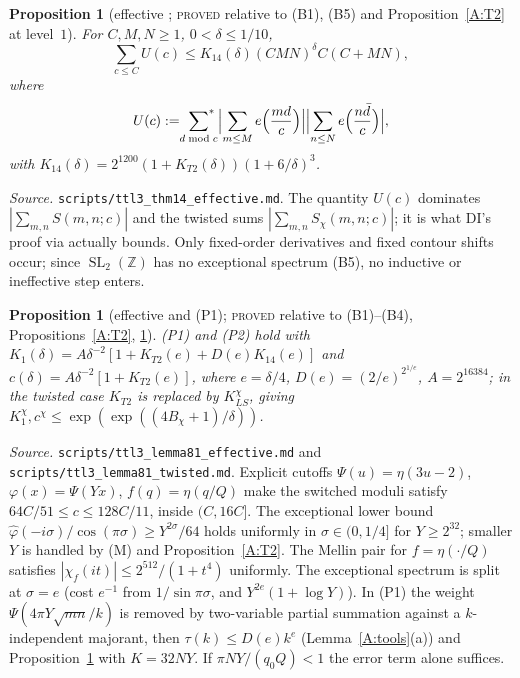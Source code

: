 \documentclass[10pt,reqno]{amsart}
\newtheorem{proposition}[theorem]{Proposition}
\theoremstyle{definition}
\numberwithin{equation}{section}
\newcommand{\Z}{\mathbb Z}
\DeclareMathOperator{\SL}{SL}
\newcommand{\status}[1]{\textup{\textsc{#1}}}
\begin{document}
\begin{proposition}[effective {\cite[Theorem~14]{DI}}; \status{proved} relative to (B1), (B5) and Proposition~\ref{A:T2} at level~$1$]\label{A:T14}
For $C,M,N\ge1$, $0<\delta\le1/10$,
\[
 \sum_{c\le C}U(c)\le K_{14}(\delta)(CMN)^\delta C(C+MN),
\]
where
\[
 U(c):=\sideset{}{^*}\sum_{d\bmod c}\Bigl|\sum_{m\le M}e\Bigl(\frac{md}c\Bigr)\Bigr|\Bigl|\sum_{n\le N}e\Bigl(\frac{n\bar d}c\Bigr)\Bigr|,
\]
with $K_{14}(\delta)=2^{1200}(1+K_{T2}(\delta))(1+6/\delta)^3$.
\end{proposition}
\emph{Source.} \nolinkurl{scripts/ttl3_thm14_effective.md}. The quantity $U(c)$ dominates
$|\sum_{m,n}S(m,n;c)|$ and the twisted sums $|\sum_{m,n}S_\chi(m,n;c)|$; it is
what DI's proof via \cite[Lemma~8.2, (8.14)]{DI} actually bounds. Only
fixed-order derivatives and fixed contour shifts occur; since $\SL_2(\Z)$
has no exceptional spectrum (B5), no inductive or ineffective step enters.

\begin{proposition}[effective {\cite[Lemma~8.1]{DI}} and (P1); \status{proved} relative to (B1)--(B4), Propositions~\ref{A:T2}, \ref{A:T14}]\label{A:L81}
(P1) and (P2) hold with $K_1(\delta)=A\delta^{-2}[1+K_{T2}(e)+D(e)K_{14}(e)]$ and
$c(\delta)=A\delta^{-2}[1+K_{T2}(e)]$, where $e=\delta/4$, $D(e)=(2/e)^{2^{1/e}}$,
$A=2^{16384}$; in the twisted case $K_{T2}$ is replaced by $K_{LS}^\chi$, giving
$K_1^\chi,c^\chi\le\exp(\exp((4B_\chi+1)/\delta))$.
\end{proposition}
\emph{Source.} \nolinkurl{scripts/ttl3_lemma81_effective.md} and
\nolinkurl{scripts/ttl3_lemma81_twisted.md}. Explicit cutoffs
$\Psi(u)=\eta(3u-2)$, $\varphi(x)=\Psi(Yx)$, $f(q)=\eta(q/Q)$ make the switched
moduli satisfy $64C/51\le c\le128C/11$, inside $(C,16C]$. The exceptional lower
bound $\hat\varphi(-i\sigma)/\cos(\pi\sigma)\ge Y^{2\sigma}/64$ holds uniformly in
$\sigma\in(0,1/4]$ for $Y\ge2^{32}$; smaller $Y$ is handled by (M) and
Proposition~\ref{A:T2}. The Mellin pair for $f=\eta(\cdot/Q)$ satisfies
$|\chi_f(it)|\le2^{512}/(1+t^4)$ uniformly. The exceptional spectrum is split at
$\sigma=e$ (cost $e^{-1}$ from $1/\sin\pi\sigma$, and $Y^{2e}(1+\log Y)$). In (P1)
the weight $\Psi(4\pi Y\sqrt{mn}/k)$ is removed by two-variable partial
summation against a $k$-independent majorant, then $\tau(k)\le D(e)k^e$
(Lemma~\ref{A:tools}(a)) and Proposition~\ref{A:T14} with $K=32NY$. If
$\pi NY/(q_0Q)<1$ the error term alone suffices.
\end{document}
